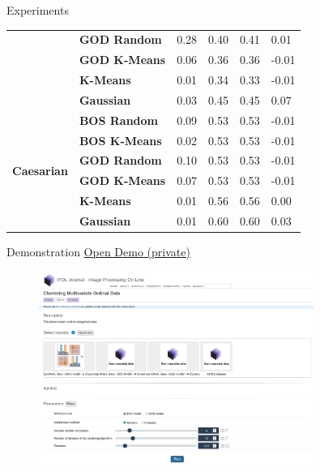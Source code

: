 \documentclass{beamer}
\begin{document}
\begin{frame}{Experiments}
\begin{table}
{\begin{tabular}{llllll}
    \textbf{} & \textbf{GOD Random} & 0.28 & 0.40 & 0.41 & 0.01 \\
    \textbf{} & \textbf{GOD K-Means} & 0.06 & 0.36 & 0.36 & -0.01 \\
    \textbf{} & \textbf{K-Means} & 0.01 & 0.34 & 0.33 & -0.01 \\
    \textbf{} & \textbf{Gaussian} & 0.03 & 0.45 & 0.45 & 0.07 \\
    \cline{1-6}
    \multirow[t]{6}{*}{\textbf{Caesarian}} & \textbf{BOS Random} & 0.09 & 0.53 & 0.53 & -0.01 \\
    \textbf{} & \textbf{BOS K-Means} & 0.02 & 0.53 & 0.53 & -0.01 \\
    \textbf{} & \textbf{GOD Random} & 0.10 & 0.53 & 0.53 & -0.01 \\
    \textbf{} & \textbf{GOD K-Means} & 0.07 & 0.53 & 0.53 & -0.01 \\
    \textbf{} & \textbf{K-Means} & 0.01 & 0.56 & 0.56 & 0.00 \\
    \textbf{} & \textbf{Gaussian} & 0.01 & 0.60 & 0.60 & 0.03 \\
    \cline{1-6}
    \end{tabular}
    }
    \end{table}

\end{frame}

\begin{frame}{Demonstration}
    \hyperlink{https://ipolcore.ipol.im/demo/clientApp/demo.html?id=77777000487}{Open Demo (private)}
    \begin{figure}
        \includegraphics[width=0.8\textwidth]{Attachments/demo.png}
    \end{figure}
\end{frame}
\end{document}
